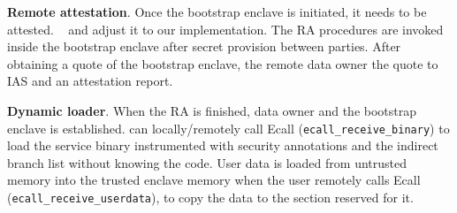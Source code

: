 \vspace{3pt}\noindent\textbf{Remote attestation}.\label{subsec:ra-impl}
Once the bootstrap enclave is initiated, it needs to be attested. 
~\cite{knauth2018integrating} and adjust it to our implementation.
\DIFaddbegin {}\DIFaddend %
The RA procedures are invoked inside the bootstrap enclave after secret provision between parties. After obtaining a quote of the bootstrap enclave, the remote data owner \DIFdelbegin {}\DIFdelend \DIFaddbegin {}\DIFaddend the quote to IAS and \DIFdelbegin {}\DIFdelend \DIFaddbegin {}\DIFaddend an attestation report. 



\vspace{3pt}\noindent\textbf{Dynamic loader}. 
When the RA is finished, \DIFdelbegin {}\DIFdelend \DIFaddbegin {}\DIFaddend data owner and the bootstrap enclave is established. \DIFdelbegin {}\DIFdelend \DIFaddbegin {}\DIFaddend can locally/remotely call Ecall (\verb|ecall_receive_binary|) to load the service binary instrumented with security annotations and the indirect branch list without knowing the code. 
User data is loaded from untrusted memory into the trusted enclave memory when the user remotely calls Ecall (\verb|ecall_receive_userdata|), to copy the data to the section reserved for it.

